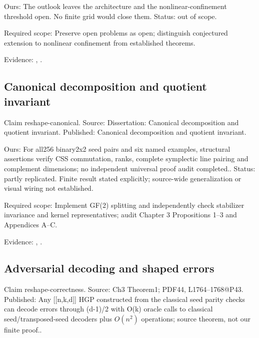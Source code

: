 Ours: The outlook leaves the architecture and the nonlinear-confinement threshold open. No finite grid would close them. Status: out of scope.

Required scope: Preserve open problems as open; distinguish conjectured extension to nonlinear confinement from established theorems.

Evidence: \href{https://github.com/alectionary/vibe-math/blob/master/formalization/quintavalle-hgp/sources/browser-extraction.txt}{}, \href{https://github.com/alectionary/vibe-math/blob/master/formalization/quintavalle-hgp/availability.md}{}.
\subsection{Canonical decomposition and quotient invariant}\label{claim:reshape-canonical}
Claim reshape-canonical. Source: Dissertation: Canonical decomposition and quotient invariant. Published: Canonical decomposition and quotient invariant.

Ours: For all256 binary2x2 seed pairs and six named examples, structural assertions verify CSS commutation, ranks, complete symplectic line pairing and complement dimensions; no independent universal proof audit completed.. Status: partly replicated. Finite result stated explicitly; source-wide generalization or visual wiring not established.

Required scope: Implement GF(2) splitting and independently check stabilizer invariance and kernel representatives; audit Chapter 3 Propositions 1--3 and Appendices A--C.

Evidence: \href{https://github.com/alectionary/vibe-math/blob/master/formalization/quintavalle-hgp/sources/browser-extraction.txt}{}, \href{https://github.com/alectionary/vibe-math/blob/master/formalization/quintavalle-hgp/availability.md}{}.
\subsection{Adversarial decoding and shaped errors}\label{claim:reshape-correctness}
Claim reshape-correctness. Source: Ch3 Theorem1; PDF44, L1764--1768@P43. Published: Any [[n,k,d]] HGP constructed from the classical seed parity checks can decode errors through (d-1)/2 with O(k) oracle calls to classical seed/transposed-seed decoders plus $O(n^2)$ operations; source theorem, not our finite proof..

